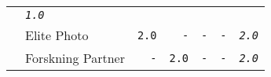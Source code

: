 \documentclass[11pt,A4paper,]{article}
\begin{document}
\begin{longtable}[]{@{}llrrrrr@{}}
\begin{minipage}[t]{0.14\columnwidth}
\end{minipage} & \begin{minipage}[t]{0.14\columnwidth}\raggedleft\strut
\emph{\texttt{1.0}}\strut
\end{minipage}\tabularnewline
\begin{minipage}[t]{0.14\columnwidth}\raggedright\strut
\strut
\end{minipage} & \begin{minipage}[t]{0.14\columnwidth}\raggedright\strut
Elite Photo\strut
\end{minipage} & \begin{minipage}[t]{0.14\columnwidth}\raggedleft\strut
\texttt{2.0}\strut
\end{minipage} & \begin{minipage}[t]{0.14\columnwidth}\raggedleft\strut
\texttt{-}\strut
\end{minipage} & \begin{minipage}[t]{0.14\columnwidth}\raggedleft\strut
\texttt{-}\strut
\end{minipage} & \begin{minipage}[t]{0.14\columnwidth}\raggedleft\strut
\texttt{-}\strut
\end{minipage} & \begin{minipage}[t]{0.14\columnwidth}\raggedleft\strut
\emph{\texttt{2.0}}\strut
\end{minipage}\tabularnewline
\begin{minipage}[t]{0.14\columnwidth}\raggedright\strut
\strut
\end{minipage} & \begin{minipage}[t]{0.14\columnwidth}\raggedright\strut
Forskning Partner\strut
\end{minipage} & \begin{minipage}[t]{0.14\columnwidth}\raggedleft\strut
\texttt{-}\strut
\end{minipage} & \begin{minipage}[t]{0.14\columnwidth}\raggedleft\strut
\texttt{2.0}\strut
\end{minipage} & \begin{minipage}[t]{0.14\columnwidth}\raggedleft\strut
\texttt{-}\strut
\end{minipage} & \begin{minipage}[t]{0.14\columnwidth}\raggedleft\strut
\texttt{-}\strut
\end{minipage} & \begin{minipage}[t]{0.14\columnwidth}\raggedleft\strut
\emph{\texttt{2.0}}\strut
\end{minipage}\tabularnewline

\end{longtable}
\end{document}
